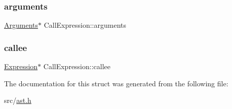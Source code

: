 \subsubsection{\texorpdfstring{arguments}{arguments}}
{\footnotesize\ttfamily \hyperlink{struct_arguments}{Arguments}$\ast$ Call\+Expression\+::arguments}

\mbox{\label{struct_call_expression_a2d77ccd1a2d6f34d718063f0eb47bc21}} 
\subsubsection{\texorpdfstring{callee}{callee}}
{\footnotesize\ttfamily \hyperlink{struct_expression}{Expression}$\ast$ Call\+Expression\+::callee}



The documentation for this struct was generated from the following file\+:\begin{DoxyCompactItemize}
\item 
src/\hyperlink{ast_8h}{ast.\+h}\end{DoxyCompactItemize}
